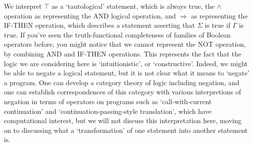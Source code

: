 \documentclass{article}
\theoremstyle{plain}
\begin{document}
We interpret $\top$ as a `tautological' statement, which is always true, the $\wedge$ operation as representing the AND logical operation, and $\Rightarrow$ as representing the IF-THEN operation, which describes a statement asserting that $\Sigma$ is true if $\Gamma$ is true. If you've seen the truth-functional completeness of families of Boolean operators before, you might notice that we cannot represent the NOT operation, by combining AND and IF-THEN operations. This represents the fact that the logic we are considering here is `intuitionistic', or `constructive'. Indeed, we might be able to negate a logical statement, but it is not clear what it means to `negate' a program. One can develop a category theory of logic including negation, and one can establish correspondences of this category with various interpretions of negation in terms of operators on programs such as `call-with-current continuation' and `continuation-passing-style translation', which have computational interest, but we will not discuss this interpretation here, moving on to discussing what a `transformation' of one statement into another statement is.
\end{document}

